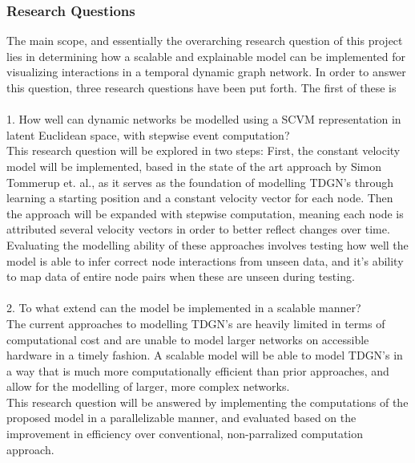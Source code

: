 \subsubsection{Research Questions} 
\label{sec:Intro:ResearchQs}
The main scope, and essentially the overarching research question of this project lies in determining how a scalable and explainable model can be implemented for visualizing interactions in a temporal dynamic graph network.
In order to answer this question, three research questions have been put forth.
The first of these is
\\\\
\hspace*{5mm} 1. How well can dynamic networks be modelled using a SCVM representation in latent Euclidean space, with stepwise event computation?
\\
This research question will be explored in two steps:
First, the constant velocity model will be implemented, based in the state of the art approach by Simon Tommerup et. al., as it serves as the foundation of modelling TDGN's through learning a starting position and a constant velocity vector for each node.
Then the approach will be expanded with stepwise computation, meaning each node is attributed several velocity vectors in order to better reflect changes over time.
\\
Evaluating the modelling ability of these approaches involves testing how well the model is able to infer correct node interactions from unseen data, and it's ability to map data of entire node pairs when these are unseen during testing.
\\\\
\hspace*{5mm} 2. To what extend can the model be implemented in a scalable manner?
\\
The current approaches to modelling TDGN's are heavily limited in terms of computational cost and are unable to model larger networks on accessible hardware in a timely fashion.
A scalable model will be able to model TDGN's in a way that is much more computationally efficient than prior approaches, and allow for the modelling of larger, more complex networks.
\\
This research question will be answered by implementing the computations of the proposed model in a parallelizable manner, and evaluated based on the improvement in efficiency over conventional, non-parralized computation approach.
